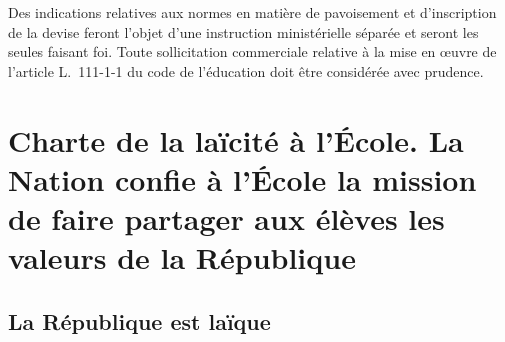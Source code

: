 Des indications relatives aux normes en matière de pavoisement et d’inscription de la devise feront l’objet d’une instruction ministérielle séparée et seront les seules faisant foi. Toute sollicitation commerciale relative à la mise en œuvre de l’article L.~111-1-1 du code de l’éducation doit être considérée avec prudence.

\appendix
\section{Charte de la laïcité à l'École. La Nation confie à l'École la mission de faire partager aux élèves les valeurs de la République}
\subsection{La République est laïque}
